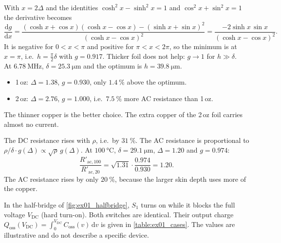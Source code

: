 \begin{solutionblock}
	With $x=2\Delta$ and the identities $\cosh^2 x-\sinh^2 x=1$ and $\cos^2 x+\sin^2 x=1$ the derivative becomes
	\begin{equation}
		\frac{\mathrm{d}g}{\mathrm{d}x} = \frac{(\cosh x+\cos x)(\cosh x-\cos x)-(\sinh x+\sin x)^2}{(\cosh x-\cos x)^2} = \frac{-2\sinh x\,\sin x}{(\cosh x-\cos x)^2}.
	\end{equation}
	It is negative for $0<x<\pi$ and positive for $\pi<x<2\pi$, so the minimum is at $x=\pi$, i.e.\ $h=\frac{\pi}{2}\delta$ with $g=0.917$. Thicker foil does not help: $g\rightarrow 1$ for $h\gg\delta$.\\
	At $\SI{6.78}{\mega\hertz}$, $\delta=\SI{25.3}{\micro\meter}$ and the optimum is $h=\SI{39.8}{\micro\meter}$.
	\begin{itemize}
		\item 1\,oz: $\Delta=1.38$, $g=0.930$, only $\SI{1.4}{\percent}$ above the optimum.
		\item 2\,oz: $\Delta=2.76$, $g=1.000$, i.e.\ $\SI{7.5}{\percent}$ more AC resistance than 1\,oz.
	\end{itemize}
	The thinner copper is the better choice. The extra copper of the 2\,oz foil carries almost no current.
\end{solutionblock}


\begin{solutionblock}
	The DC resistance rises with $\rho$, i.e.\ by $\SI{31}{\percent}$. The AC resistance is proportional to $\rho/\delta\cdot g(\Delta)\propto\sqrt{\rho}\,g(\Delta)$. At $\SI{100}{\celsius}$, $\delta=\SI{29.1}{\micro\meter}$, $\Delta=1.20$ and $g=0.974$:
	\begin{equation}
		\frac{R'_\mathrm{ac,100}}{R'_\mathrm{ac,20}} = \sqrt{1.31}\cdot\frac{0.974}{0.930} = 1.20.
	\end{equation}
	The AC resistance rises by only $\SI{20}{\percent}$, because the larger skin depth uses more of the copper.
\end{solutionblock}



In the half-bridge of \autoref{fig:ex01_halfbridge}, $S_1$ turns on while it blocks the full voltage $V_\mathrm{DC}$ (hard turn-on). Both switches are identical. Their output charge $Q_\mathrm{oss}(V_\mathrm{DC})=\int_0^{V_\mathrm{DC}}C_\mathrm{oss}(v)\,\mathrm{d}v$ is given in \autoref{table:ex01_cases}. The values are illustrative and do not describe a specific device.

